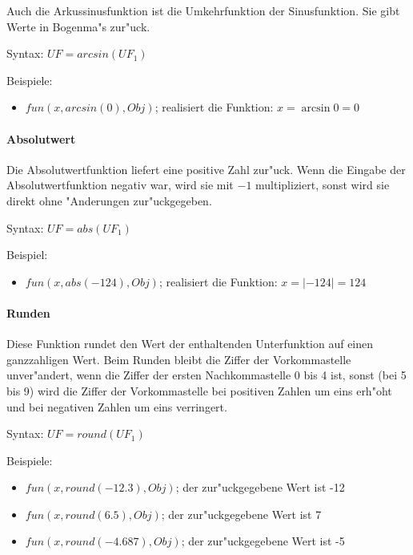 Auch die Arkussinusfunktion ist die Umkehrfunktion der Sinusfunktion. Sie gibt Werte in Bogenma"s zur"uck.

\bigskip\noindent
Syntax:
$UF=arcsin( UF_1 )$

\bigskip\noindent
Beispiele:
\begin{itemize}
 \item $fun(x, arcsin(0), Obj)$; realisiert die Funktion: $x=\arcsin{0}=0$
\end{itemize}


\paragraph{Absolutwert}

Die Absolutwertfunktion liefert eine positive Zahl zur"uck. Wenn die Eingabe der Absolutwertfunktion negativ war, wird sie mit $-1$ multipliziert, sonst wird sie direkt ohne "Anderungen zur"uckgegeben.

\bigskip\noindent
Syntax:
$UF=abs( UF_1 )$

\bigskip\noindent
Beispiel:
\begin{itemize}
 \item $fun(x, abs(-124), Obj)$; realisiert die Funktion: $x=|-124|=124$
\end{itemize}


\paragraph{Runden}

Diese Funktion rundet den Wert der enthaltenden Unterfunktion auf einen ganzzahligen Wert.
Beim Runden bleibt die Ziffer der Vorkommastelle unver"andert, wenn die Ziffer der ersten Nachkommastelle 0 bis 4 ist, sonst (bei 5 bis 9) wird die Ziffer der Vorkommastelle bei positiven Zahlen um eins erh"oht und bei negativen Zahlen um eins verringert.

\bigskip\noindent
Syntax:
$UF=round( UF_1 )$

\bigskip\noindent
Beispiele:
\begin{itemize}
 \item $fun(x, round(-12.3), Obj)$; der zur"uckgegebene Wert ist -12
 \item $fun(x, round(6.5), Obj)$; der zur"uckgegebene Wert ist 7
 \item $fun(x, round(-4.687), Obj)$; der zur"uckgegebene Wert ist -5
\end{itemize}


